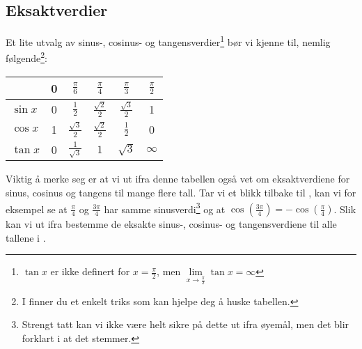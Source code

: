 \subsection{Eksaktverdier \label{eksaktverdier}}
Et lite utvalg av sinus-, cosinus- og tangensverdier\footnote{$ \tan x $ er ikke definert for $ {x=\frac{\pi}{2}} $, men $ {\lim\limits_{x\to\frac{\pi}{2} }\tan x =\infty} $} bør vi kjenne til, nemlig følgende\footnote{I  finner du et enkelt triks som kan hjelpe deg å huske tabellen.}:

{\centering		\renewcommand{\arraystretch}{1.5}	
		\begin{tabular}{l|c|c|c|c|c}
			& 0&$\frac{\pi}{6}$ & $\frac{\pi}{4}$ &$\frac{\pi}{3}$ & $\frac{\pi}{2}$    \\
			\hline
			$\sin x$ & 0 &$\frac{1}{2}$ & $\frac{\sqrt{2}}{2}$ & $\frac{\sqrt{3}}{2}$ & 1 \\
			$\cos x$ & 1 & $\frac{\sqrt{3}}{2}$ & $\frac{\sqrt{2}}{2}$ & $\frac{1}{2}$ & 0 \\
			$\tan x$ & 0 &$\frac{1}{\sqrt{3}}$ & $1$ & $\sqrt{3}$ & $ \infty  $
		\end{tabular}
} \vspace{12pt}
Viktig å merke seg er at vi ut ifra denne tabellen også vet om eksaktverdiene for sinus, cosinus og tangens til mange flere tall. Tar vi et blikk tilbake til , kan vi for eksempel se at $ \frac{\pi}{4} $ og $ \frac{3\pi}{4} $ har samme sinusverdi\footnote{Strengt tatt kan vi ikke være helt sikre på dette ut ifra øyemål, men det blir forklart i  at det stemmer.} og at $ {\cos \left(\frac{3\pi}{4}\right)=-\cos \left(\frac{\pi}{4}\right) }$. Slik kan vi ut ifra  bestemme de eksakte sinus-, cosinus- og tangensverdiene til alle tallene i .
\newpage
